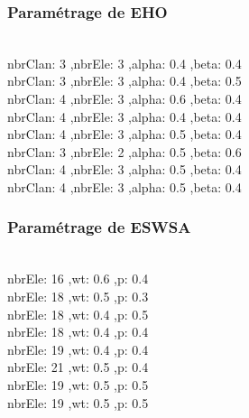 \noindent
\begin{minipage}[t]{0.55\textwidth}
\subsubsection{Paramétrage de EHO}
\vspace{-0.5cm}
\textbf{}\\
nbrClan: 3 ,nbrEle: 3 ,alpha: 0.4 ,beta: 0.4\\
nbrClan: 3 ,nbrEle: 3 ,alpha: 0.4 ,beta: 0.5\\
nbrClan: 4 ,nbrEle: 3 ,alpha: 0.6 ,beta: 0.4\\
nbrClan: 4 ,nbrEle: 3 ,alpha: 0.4 ,beta: 0.4\\
nbrClan: 4 ,nbrEle: 3 ,alpha: 0.5 ,beta: 0.4\\
nbrClan: 3 ,nbrEle: 2 ,alpha: 0.5 ,beta: 0.6\\
nbrClan: 4 ,nbrEle: 3 ,alpha: 0.5 ,beta: 0.4\\
nbrClan: 4 ,nbrEle: 3 ,alpha: 0.5 ,beta: 0.4
\end{minipage}\hfill
\begin{minipage}[t]{0.4\textwidth}
\subsubsection{Paramétrage de ESWSA}
\vspace{-0.5cm}
\textbf{}\\
nbrEle: 16 ,wt: 0.6 ,p: 0.4\\
nbrEle: 18 ,wt: 0.5 ,p: 0.3\\
nbrEle: 18 ,wt: 0.4 ,p: 0.5\\
nbrEle: 18 ,wt: 0.4 ,p: 0.4\\
nbrEle: 19 ,wt: 0.4 ,p: 0.4\\
nbrEle: 21 ,wt: 0.5 ,p: 0.4\\
nbrEle: 19 ,wt: 0.5 ,p: 0.5\\
nbrEle: 19 ,wt: 0.5 ,p: 0.5

\end{minipage}\hfill

















